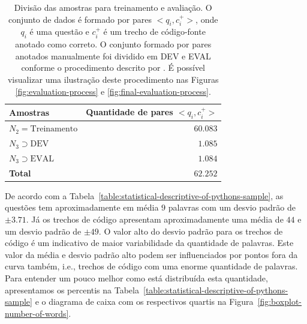 \begin{table}[h]
\centering
\begin{tabular}{ p{5cm} r  }
 \hline
 \textbf{Amostras} & \textbf{Quantidade de pares $<q_{i}, c_{i}^{+}>$}\\
 \hline
 $N_{2} = \text{Treinamento}$ & $60.083$\\
 
 $N_{3} \supset \text{DEV}$ & $1.085$ \\
 
 $N_{3} \supset \text{EVAL}$ & $1.084$\\
 \hline
 \textbf{Total} & $\bm{62.252}$\\
 \hline
\end{tabular}
\caption{Divisão das amostras para treinamento e avaliação. O conjunto de dados é formado por pares $<q_{i}, c_{i}^{+}>$, onde $q_{i}$ é uma questão e $c_{i}^{+}$ é um trecho de código-fonte anotado como correto. O conjunto formado por pares anotados manualmente foi dividido em DEV e EVAL conforme o procedimento descrito por \cite{iyer-etal-2016-summarizing}. É possível visualizar uma ilustração deste procedimento nas Figuras \ref{fig:evaluation-process} e \ref{fig:final-evaluation-process}.}
\label{table:divisao-amostras}
\end{table}


De acordo com a Tabela~\ref{table:statistical-descriptive-of-pythons-sample}, as questões tem aproximadamente em média $9$ palavras com um desvio padrão de $\pm 3.71$. Já os trechos de código apresentam aproximadamente uma média de $44$ e um desvio padrão de $\pm 49$. O valor alto do desvio padrão para os trechos de código é um indicativo de maior variabilidade da quantidade de palavras. Este valor da média e desvio padrão alto podem ser influenciados por pontos fora da curva também, i.e., trechos de código com uma enorme quantidade de palavras. Para entender um pouco melhor como está distribuída esta quantidade, apresentamos os percentis na Tabela~\ref{table:statistical-descriptive-of-pythons-sample} e o diagrama de caixa com os respectivos quartis na Figura~\ref{fig:boxplot-number-of-words}.

